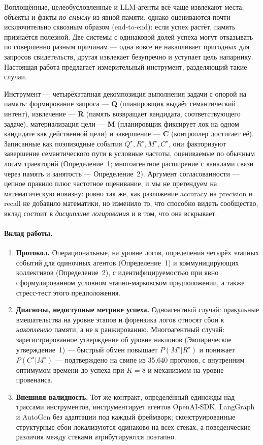 \documentclass[letterpaper]{article} %
\begin{document}
Воплощённые, целеобусловленные и LLM-агенты всё чаще извлекают места,
объекты и факты \emph{по смыслу} из явной памяти, однако оцениваются
почти исключительно сквозным образом (end-to-end): если успех растёт,
память признаётся полезной. Две системы с одинаковой долей успеха
могут отказывать по совершенно разным причинам --- одна вовсе не
накапливает пригодных для запросов свидетельств, другая извлекает
безупречно и уступает цель напарнику. Настоящая работа предлагает
измерительный инструмент, разделяющий такие случаи.

Инструмент --- четырёхэтапная декомпозиция выполнения задачи с опорой
на память: формирование запроса --- \textbf{Q} (планировщик выдаёт
семантический интент), извлечение --- \textbf{R} (память возвращает
кандидата, соответствующего задаче), материализация цели ---
\textbf{M} (планировщик фиксирует лок на одном кандидате как
действенной цели) и завершение --- \textbf{C} (контроллер достигает
её). Записанные как поэпизодные события
$Q^\star,R^\star,M^\star,C^\star$, они факторизуют завершение
семантического пути в условные частоты, оцениваемые по обычным логам
траекторий (Определение~1; многоагентное расширение с каналами связи
через память и занятость --- Определение~2). Аргумент согласованности
--- цепное правило плюс частотное оценивание, и мы не претендуем на
математическую новизну: ровно так же, как разложение accuracy на
precision и recall не добавило математики, но изменило то, что
способно видеть сообщество, вклад состоит в \emph{дисциплине
логирования} и в том, что она вскрывает.

\paragraph{Вклад работы.}
\begin{enumerate}
\item \textbf{Протокол.} Операциональные, на уровне логов,
  определения четырёх этапных событий для одиночных агентов
  (Определение~1) и коммуницирующих коллективов (Определение~2), с
  идентифицируемостью при явно сформулированном условном
  этапно-марковском предположении, а также стресс-тест этого
  предположения.
\item \textbf{Диагнозы, недоступные метрике успеха.} Одноагентный
  случай: оракульные вмешательства на уровне этапов и форензика логов
  относят сбои к \emph{накоплению} памяти, а не к ранжированию.
  Многоагентный случай: зарегистрированное утверждение об уровне
  наклонов (Эмпирическое утверждение~1) --- быстрый обмен повышает
  $P(M^\star|R^\star)$ и понижает $P(C^\star|M^\star)$ ---
  подтверждено на свипе из 35{,}640 прогонов, с внутренним оптимумом
  времени до успеха при $K{=}8$ и механизмом на уровне провенанса.
\item \textbf{Внешняя валидность.} Тот же контракт, определённый
  единожды над трассами инструментов, инструментирует агентов
  OpenAI-SDK, LangGraph и AutoGen без адаптации под каждый фреймворк;
  сконструированные структурные сбои локализуются одинаково на всех
  стеках, а поведенческие различия между стеками атрибутируются
  поэтапно.
\end{enumerate}
\end{document}

